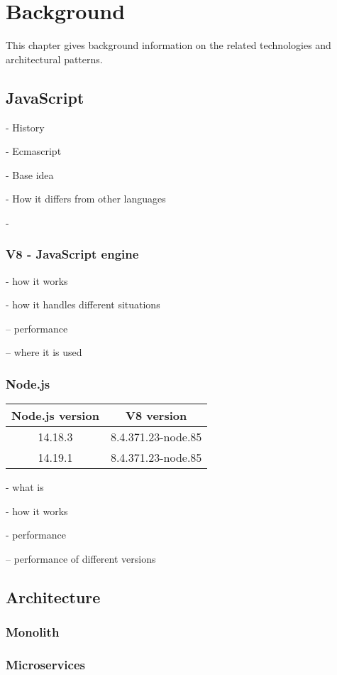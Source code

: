 \chapter{Background\label{background}}
This chapter gives background information on the related technologies and architectural patterns.


\section{JavaScript}
- History

- Ecmascript

- Base idea

- How it differs from other languages

- 


\subsection{V8 - JavaScript engine}
- how it works

- how it handles different situations

-- performance

-- where it is used





\subsection{Node.js}

\begin{center}
\begin{tabular}{|c c|} 
 \hline
 Node.js version & V8 version \\ [0.5ex] 
 \hline
 14.18.3 & 8.4.371.23-node.85  \\ 
 \hline
  14.19.1 & 8.4.371.23-node.85  \\ 
 \hline
\end{tabular}
\end{center}

- what is

- how it works

- performance

-- performance of different versions











\section{Architecture}

\subsection{Monolith}

\subsection{Microservices}
